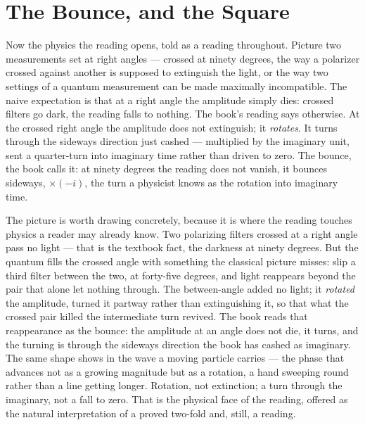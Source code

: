 \section{The Bounce, and the Square}

Now the physics the reading opens, told as a reading throughout. Picture two measurements set at right angles ---
crossed at ninety degrees, the way a polarizer crossed against another is supposed to extinguish the light, or the
way two settings of a quantum measurement can be made maximally incompatible. The naive expectation is that at a
right angle the amplitude simply dies: crossed filters go dark, the reading falls to nothing. The book's reading
says otherwise. At the crossed right angle the amplitude does not extinguish; it \emph{rotates}. It turns through
the sideways direction just cashed --- multiplied by the imaginary unit, sent a quarter-turn into imaginary time
rather than driven to zero. The bounce, the book calls it: at ninety degrees the reading does not vanish, it
bounces sideways, $\times(-i)$, the turn a physicist knows as the rotation into imaginary time.

The picture is worth drawing concretely, because it is where the reading touches physics a reader may already
know. Two polarizing filters crossed at a right angle pass no light --- that is the textbook fact, the darkness at
ninety degrees. But the quantum fills the crossed angle with something the classical picture misses: slip a third
filter between the two, at forty-five degrees, and light reappears beyond the pair that alone let nothing through.
The between-angle added no light; it \emph{rotated} the amplitude, turned it partway rather than extinguishing it,
so that what the crossed pair killed the intermediate turn revived. The book reads that reappearance as the
bounce: the amplitude at an angle does not die, it turns, and the turning is through the sideways direction the
book has cashed as imaginary. The same shape shows in the wave a moving particle carries --- the phase that
advances not as a growing magnitude but as a rotation, a hand sweeping round rather than a line getting longer.
Rotation, not extinction; a turn through the imaginary, not a fall to zero. That is the physical face of the
reading, offered as the natural interpretation of a proved two-fold and, still, a reading.

